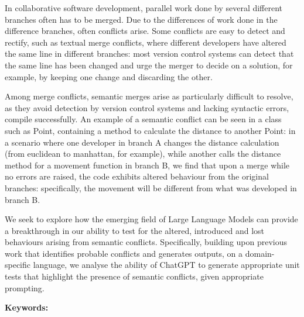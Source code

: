 In collaborative software development, parallel work done by several different branches often has to be merged. Due to the differences of work done in the difference branches, often conflicts arise. Some conflicts are easy to detect and rectify, such as textual merge conflicts, where different developers have altered the same line in different branches: most version control systems can detect that the same line has been changed and urge the merger to decide on a solution, for example, by keeping one change and discarding the other.

Among merge conflicts, semantic merges arise as particularly difficult to resolve, as they avoid detection by version control systems and lacking syntactic errors, compile successfully. An example of a semantic conflict can be seen in a class such as Point, containing a method to calculate the distance to another Point: in a scenario where one developer in branch A changes the distance calculation (from euclidean to manhattan, for example), while another calls the distance method for a movement function in branch B, we find that upon a merge while no errors are raised, the code exhibits altered behaviour from the original branches: specifically, the movement will be different from what was developed in branch B.

We seek to explore how the emerging field of Large Language Models can provide a breakthrough in our ability to test for the altered, introduced and lost behaviours arising from semantic conflicts. Specifically, building upon previous work that identifies probable conflicts and generates outputs, on a domain-specific language, we analyse the ability of ChatGPT to generate appropriate unit tests that highlight the presence of semantic conflicts, given appropriate prompting.

\bigskip\noindent
\textbf{Keywords:} 
